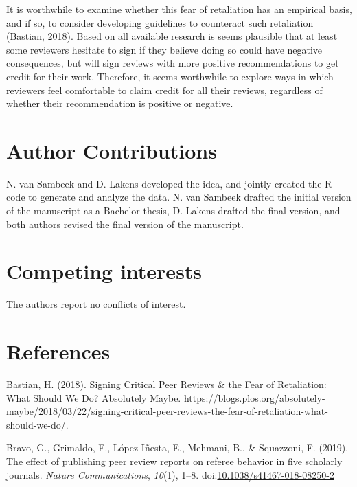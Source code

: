 \documentclass[,jou, a4paper,floatsintext]{apa6}
\begin{document}
It is worthwhile to examine whether this fear of retaliation has an empirical basis, and if so, to consider developing guidelines to counteract such retaliation (Bastian, 2018). Based on all available research is seems plausible that at least some reviewers hesitate to sign if they believe doing so could have negative consequences, but will sign reviews with more positive recommendations to get credit for their work. Therefore, it seems worthwhile to explore ways in which reviewers feel comfortable to claim credit for all their reviews, regardless of whether their recommendation is positive or negative.

\hypertarget{author-contributions}{%
\section{Author Contributions}\label{author-contributions}}

N. van Sambeek and D. Lakens developed the idea, and jointly created the R code to generate and analyze the data. N. van Sambeek drafted the initial version of the manuscript as a Bachelor thesis, D. Lakens drafted the final version, and both authors revised the final version of the manuscript.

\hypertarget{competing-interests}{%
\section{Competing interests}\label{competing-interests}}

The authors report no conflicts of interest.

\hypertarget{references}{%
\section{References}\label{references}}

\setlength{\parindent}{-0.5in}
\setlength{\leftskip}{0.5in}

\hypertarget{refs}{}
\leavevmode\hypertarget{ref-bastian_signing_2018}{}%
Bastian, H. (2018). Signing Critical Peer Reviews \& the Fear of Retaliation: What Should We Do? \textbar{} Absolutely Maybe. https://blogs.plos.org/absolutely-maybe/2018/03/22/signing-critical-peer-reviews-the-fear-of-retaliation-what-should-we-do/.

\leavevmode\hypertarget{ref-bravo_effect_2019}{}%
Bravo, G., Grimaldo, F., López-Iñesta, E., Mehmani, B., \& Squazzoni, F. (2019). The effect of publishing peer review reports on referee behavior in five scholarly journals. \emph{Nature Communications}, \emph{10}(1), 1--8. doi:\href{https://doi.org/10.1038/s41467-018-08250-2}{10.1038/s41467-018-08250-2}
\end{document}
